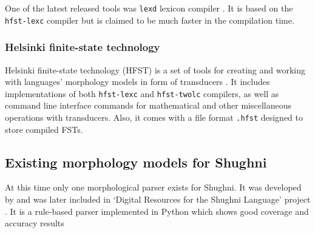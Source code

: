 One of the latest released tools was \texttt{lexd} lexicon compiler \parencite{swanson_lexd_2021}. It is based on the \texttt{hfst-lexc} compiler but is claimed to be much faster in the compilation time. 

\subsubsection{Helsinki finite-state technology}
Helsinki finite-state technology (HFST) is a set of tools for creating and working with languages' morphology models in form of transducers \parencite{linden_hfst_2009}. It includes implementations of both \texttt{hfst-lexc} and \texttt{hfst-twolc} compilers, as well as command line interface commands for mathematical and other miscellaneous operations with transducers. Also, it comes with a file format \texttt{.hfst} designed to store compiled FSTs.

\subsection{Existing morphology models for Shughni}
At this time only one morphological parser exists for Shughni. It was developed by \textcite{melenchenko_2021_parser} and was later included in `Digital Resources for the Shughni Language' project \parencite{makarov_digital_2022}. It is a rule-based parser implemented in Python which shows good coverage and accuracy results 
